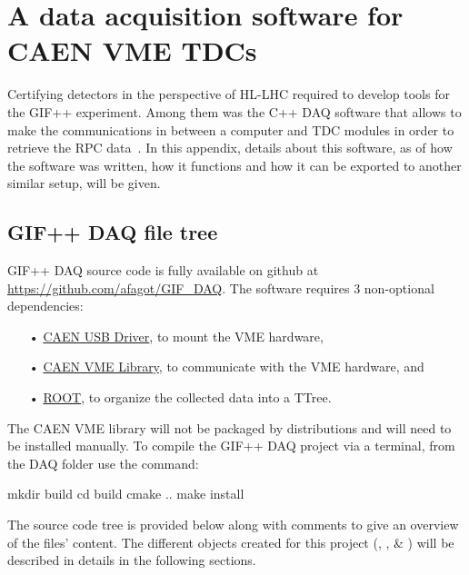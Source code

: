 \renewcommand\evenpagerightmark{{\scshape\small Appendix A}}
\renewcommand\oddpageleftmark{{\scshape\small A data acquisition software for VME CAEN TDCs}}

\renewcommand{\bibname}{References}

\hyphenation{}

\chapter[A data acquisition software for CAEN VME TDCs]%
{A data acquisition software for CAEN VME TDCs}
\label{app1}

Certifying detectors in the perspective of HL-LHC required to develop tools for the GIF++ experiment. Among them was the C++ \acf{DAQ} software that allows to make the communications in between a computer and TDC modules in order to retrieve the RPC data~\cite{GIFDAQ}. In this appendix, details about this software, as of how the software was written, how it functions and how it can be exported to another similar setup, will be given.

\section{GIF++ DAQ file tree}
\label{app1:sec:code}

	GIF++ DAQ source code is fully available on github at \url{https://github.com/afagot/GIF_DAQ}. The software requires 3 non-optional dependencies:

	\begin{itemize}
		\item[•] \href{http://www.caen.it/csite/CaenProd.jsp?idmod=417&parent=11}{CAEN USB Driver}, to mount the VME hardware,
		\item[•] \href{http://www.caen.it/csite/CaenProd.jsp?idmod=689&parent=38}{CAEN VME Library}, to communicate with the VME hardware, and
		\item[•] \href{https://root.cern.ch/downloading-root}{ROOT}, to organize the collected data into a TTree.
	\end{itemize}

	The CAEN VME library will not be packaged by distributions and will need to be installed manually. To compile the GIF++ DAQ project via a terminal, from the DAQ folder use the command:\\

	\begin{bashcode}
 mkdir build
 cd build
 cmake ..
 make install
	\end{bashcode}
\vspace{5mm}
	The source code tree is provided below along with comments to give an overview of the files' content. The different objects created for this project (, ,  \& ) will be described in details in the following sections.\\

